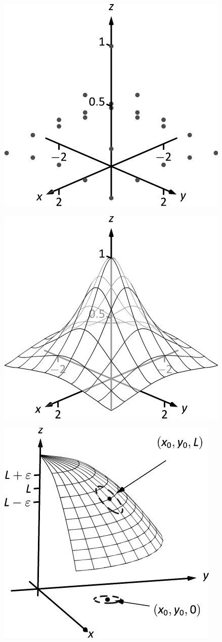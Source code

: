\documentclass[10pt]{article}
\begin{document}
\includegraphics{figmultigraph_intro_3DBW.pdf}
\texttt{}

\includegraphics{figmultigraph_introb_3DBW.pdf}
\texttt{}

\includegraphics{figmultilimit_def_3DBW.pdf}
\texttt{}
\end{document}
